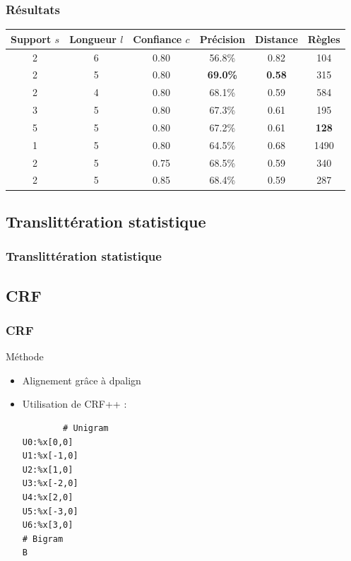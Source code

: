 \documentclass{beamer}
\begin{document}
\begin{frame}
\frametitle{Résultats}

\begin{center}
\begin{tabular}{|c|c|c||c|c|c|}
\hline
Support $s$&Longueur $l$&Confiance $c$&Précision&Distance&Règles\\
\hline
2&6&0.80&56.8\%&0.82&104\\
\hline
2&5&0.80&\textbf{69.0\%}&\textbf{0.58}&315\\
\hline
2&4&0.80&68.1\%&0.59&584\\
\hline
\hline
3&5&0.80&67.3\%&0.61&195\\
\hline
5&5&0.80&67.2\%&0.61&\textbf{128}\\
\hline
1&5&0.80&64.5\%&0.68&1490\\
\hline
\hline
2&5&0.75&68.5\%&0.59&340\\
\hline
2&5&0.85&68.4\%&0.59&287\\
\hline
\end{tabular}
\end{center}
\end{frame}

\subsection{Translittération statistique}

\begin{frame}
	\frametitle{Translittération statistique}
	
	
	
\end{frame}


\subsection{CRF}

\begin{frame}[fragile]
\frametitle{CRF}

	\begin{block}{Méthode}
		\begin{itemize}
		\item Alignement gr\^ace à dpalign
		\item Utilisation de CRF++ :
		{\scriptsize \begin{verbatim}
		# Unigram
U0:%x[0,0]
U1:%x[-1,0]
U2:%x[1,0]
U3:%x[-2,0]
U4:%x[2,0]
U5:%x[-3,0]
U6:%x[3,0]
# Bigram
B
		\end{verbatim}}
		\end{itemize}
	\end{block}
\end{frame}
\end{document}
